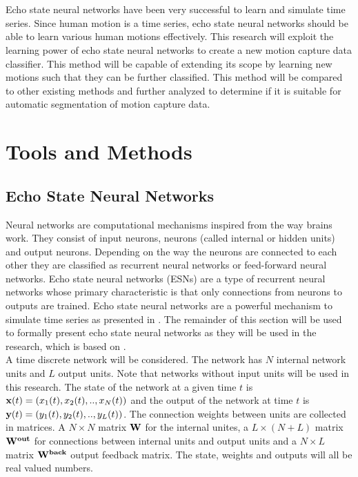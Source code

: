 \documentclass[10pt]{article}
\begin{document}
\\\\
Echo state neural networks have been very successful to learn and simulate time series\cite{JaegerESNTutorial}. Since human motion is a time series, echo state neural networks should be able to learn various human motions effectively. This research will exploit the learning power of echo state neural networks to create a new motion capture data classifier. This method will be capable of extending its scope by learning new motions such that they can be further classified. This method will be compared to other existing methods and further analyzed to determine if it is suitable for automatic segmentation of motion capture data.

\section{Tools and Methods}

\subsection{Echo State Neural Networks}

Neural networks are computational mechanisms inspired from the way brains work. They consist of input neurons, neurons (called internal or hidden units) and output neurons. Depending on the way the neurons are connected to each other they are classified as recurrent neural networks or feed-forward neural networks. Echo state neural networks (ESNs) are a type of recurrent neural networks whose primary characteristic is that only connections from neurons to outputs are trained. Echo state neural networks are a powerful mechanism to simulate time series as presented in \cite{JaegerESNTutorial}. The remainder of this section will be used to formally present echo state neural networks as they will be used in the research, which is based on \cite{JaegerESNTutorial}.\\

A time discrete network will be considered. The network has $N$ internal network units and $L$ output units. Note that networks without input units will be used in this research. The state of the network at a given time $t$ is ${\bf x}(t)=(x_1(t),x_2(t),..,x_N(t))$ and the output of the network at time $t$ is ${\bf y}(t)=(y_1(t),y_2(t),..,y_L(t))$. The connection weights between units are collected in matrices. A  $N \times N$ matrix ${\bf W}$ for the internal unites, a $L \times (N+L)$ matrix ${\bf W^{out}}$ for connections between internal units and output units and a $N \times L$ matrix ${\bf W^{back}}$ output feedback matrix. The state, weights and outputs will all be real valued numbers.\\
\end{document}
